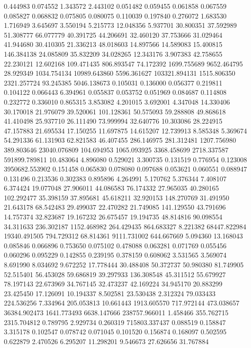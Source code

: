 0.444983
0.074552
1.343572
2.443102
0.051482
0.059455
0.061858
0.067559
0.085827
0.068832
0.075805
0.080075
0.110039
0.197840
0.276072
1.683530
1.716949
3.645697
3.550194
5.215773
12.048356
5.937701
30.800351
37.592989
51.308777
66.077779
40.391725
44.206691
32.460120
37.753666
31.029464
41.944680
30.410305
21.336213
48.018603
14.897566
14.589083
15.400815
146.384138
24.085809
35.832209
34.028265
12.343176
3.907383
42.758655
22.230121
12.602168
109.471435
806.893547
74.172392
1699.755689
9652.464795
28.929349
1034.754134
10989.643860
5596.361627
103321.894131
1515.806350
2321.257724
93.245385
5046.138673
0.105031
0.136000
0.056377
0.219811
0.104122
0.066443
6.394961
0.055837
0.053752
0.051969
0.084687
0.114808
0.232772
0.336010
0.865315
3.853082
4.201015
3.692001
4.347048
14.330406
30.170018
21.976079
39.520061
101.128361
50.575093
59.288808
49.868618
41.410498
25.937710
26.111490
73.999994
32.640776
10.303086
28.224915
47.157883
21.695534
17.150255
11.697875
14.615207
12.739913
8.585348
5.369674
54.291336
61.131903
62.821583
46.407455
286.146975
281.312481
1207.756980
389.803646
23040.076809
104.694953
1065.093925
3368.458699
2718.337587
591899.789811
10.483064
4.896080
0.529021
3.300735
0.131519
0.776954
0.123008
3950682.553902
0.151458
0.065830
0.078080
0.097688
0.053621
0.060551
0.088947
0.131496
0.213536
0.302383
0.895896
4.264991
5.170762
5.376344
7.408107
6.374424
19.077048
27.906011
44.086583
76.174332
27.965035
40.280165
102.292477
35.398159
37.895681
45.618211
32.920153
148.270769
31.491950
21.643178
68.542483
29.499037
22.470282
21.749085
141.129550
43.791696
14.757374
32.823687
19.167232
26.675457
19.194735
48.814816
90.098554
34.311633
236.302187
1152.468982
264.429435
864.683327
8.221382
68447.822984
19340.491505
794.729312
68.814361
9111.731002
644.667669
5.094360
13.168043
0.085846
0.066896
0.753650
0.075102
0.478088
0.063281
0.071769
0.055456
0.060296
0.095229
0.142855
0.239195
0.378159
0.608062
3.531565
3.569074
8.691990
8.034692
9.672252
17.778444
30.488408
50.372737
50.980380
81.749905
52.515401
56.453028
59.686819
39.297933
136.308548
45.311512
55.679927
78.197143
22.673969
34.767145
32.473237
42.169224
34.945170
20.883299
23.425450
17.126091
10.194337
8.502581
23.530438
2.312324
79.033433
224.536256
7.334964
205.053813
10.661443
1913.605570
717.972144
473.038657
36384.902473
1641.773493
6638.147666
238757.966011
1.458466
355.762715
2315.704812
0.789795
2.929734
0.260319
715803.337437
0.088519
0.158847
3.315178
0.102547
0.078742
0.071045
0.101520
0.156874
0.168097
0.502595
0.622879
2.470526
6.295207
11.298201
9.546673
27.626656
31.767884
